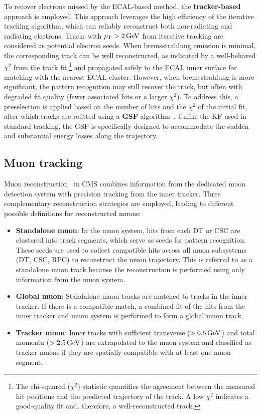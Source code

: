 To recover electrons missed by the ECAL-based method, the \textbf{tracker-based} approach is employed. This approach leverages the high efficiency of the iterative tracking algorithm, which can reliably reconstruct both non-radiating and radiating electrons. Tracks with $p_\mathrm{T} > 2\,\text{Ge\hspace{-.08em}V}$ from iterative tracking are considered as potential electron seeds. When bremsstrahlung emission is minimal, the corresponding track can be well reconstructed, as indicated by a well-behaved $\chi^2$ from the track fit,\footnote{The chi-squared ($\chi^2$) statistic quantifies the agreement between the measured hit positions and the predicted trajectory of the track. A low $\chi^2$ indicates a good-quality fit and, therefore, a well-reconstructed track.} and propagated safely to the ECAL inner surface for matching with the nearest ECAL cluster. However, when bremsstrahlung is more significant, the pattern recognition may still recover the track, but often with degraded fit quality (\ie fewer associated hits or a larger $\chi^2$). To address this, a preselection is applied based on the number of hits and the $\chi^2$ of the initial fit, after which tracks are refitted using a \textbf{\ac{GSF}} algorithm~\cite{GSF_Algorithm}. Unlike the KF used in standard tracking, the GSF is specifically designed to accommodate the sudden and substantial energy losses along the trajectory.

\subsection{Muon tracking}

Muon reconstruction~\cite{ParticleFlow} in CMS combines information from the dedicated muon detection system with precision tracking from the inner tracker. Three complementary reconstruction strategies are employed, leading to different possible definitions for reconstructed muons:

\begin{itemize}
    \item \textbf{Standalone muon}: In the muon system, hits from each DT or CSC are clustered into track segments, which serve as seeds for pattern recognition. These seeds are used to collect compatible hits across all muon subsystems (DT, CSC, RPC) to reconstruct the muon trajectory. This is referred to as a standalone muon track because the reconstruction is performed using only information from the muon system.
    \item \textbf{Global muon}: Standalone muon tracks are matched to tracks in the inner tracker. If there is a compatible match, a combined fit of the hits from the inner tracker and muon system is performed to form a global muon track.
    \item \textbf{Tracker muon}: Inner tracks with sufficient transverse ($> 0.5\,\text{Ge\hspace{-.08em}V}$) and total momenta ($>2.5\,\text{Ge\hspace{-.08em}V}$) are extrapolated to the muon system and classified as tracker muons if they are spatially compatible with at least one muon segment.
\end{itemize}


